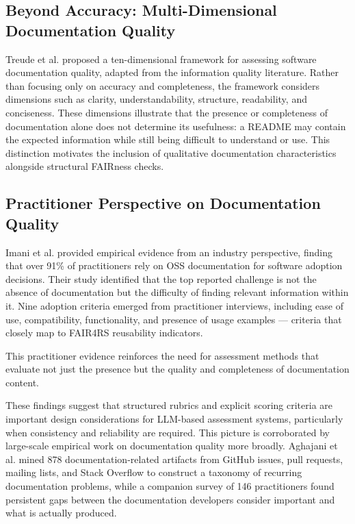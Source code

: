 \subsection{Beyond Accuracy: Multi-Dimensional Documentation Quality}

Treude et al. \cite{treude2020beyond} proposed a ten-dimensional
framework for assessing software documentation quality, adapted from
the information quality literature. Rather than focusing only on
accuracy and completeness, the framework considers dimensions such as
clarity, understandability, structure, readability, and conciseness.
These dimensions illustrate that the presence or completeness of
documentation alone does not determine its usefulness: a README may
contain the expected information while still being difficult to
understand or use. This distinction motivates the inclusion of
qualitative documentation characteristics alongside structural
FAIRness checks.

\subsection{Practitioner Perspective on Documentation Quality}

Imani et al. \cite{imani2024documentation} provided empirical 
evidence from an industry perspective, finding that over 91\% of 
practitioners rely on OSS documentation for software adoption 
decisions. Their study identified that the top reported challenge is 
not the absence of documentation but the difficulty of finding 
relevant information within it. Nine adoption criteria emerged from 
practitioner interviews, including ease of use, compatibility, 
functionality, and presence of usage examples — criteria that closely 
map to FAIR4RS reusability indicators.

This practitioner evidence reinforces the need for assessment methods 
that evaluate not just the presence but the quality and completeness 
of documentation content.

These findings suggest that structured rubrics and explicit scoring 
criteria are important design considerations for LLM-based assessment 
systems, particularly when consistency and reliability are required.
This picture is corroborated by large-scale empirical work on
documentation quality more broadly. Aghajani et al. \cite{aghajani2019issues}
mined 878 documentation-related artifacts from GitHub issues, pull
requests, mailing lists, and Stack Overflow to construct a taxonomy of
recurring documentation problems, while a companion survey of 146
practitioners \cite{aghajani2020perspective} found persistent gaps
between the documentation developers consider important and what is
actually produced.

